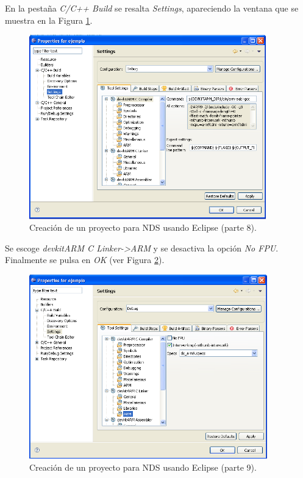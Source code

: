 En la pestaña \textit{C/C++ Build} se resalta \textit{Settings}, apareciendo la ventana que se muestra en la Figura \ref{fig_c2_eclipse7}.

\begin{figure}[t]
	\centering
	\includegraphics[height=8cm]{./Figuras/C2/c2_eclipse7.png}
	\caption{Creación de un proyecto para NDS usando Eclipse  (parte 8).}
	\label{fig_c2_eclipse7}
\end{figure}

Se escoge \textit{devkitARM C Linker->ARM} y se desactiva la opción \textit{No FPU}. Finalmente se pulsa en \textit{OK} (ver Figura \ref{fig_c2_eclipse8}).

\begin{figure}[t]
	\centering
	\includegraphics[height=8cm]{./Figuras/C2/c2_eclipse8.png}
	\caption{Creación de un proyecto para NDS usando Eclipse  (parte 9).}
	\label{fig_c2_eclipse8}
\end{figure}

